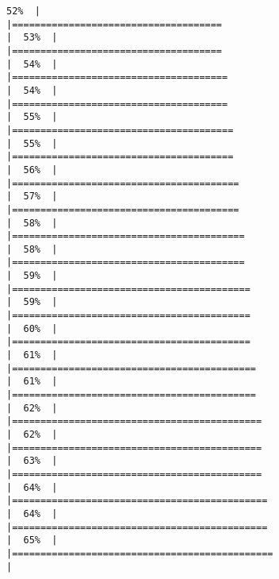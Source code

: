 \documentclass[
]{article}
\begin{document}
\begin{verbatim}
52%  |                                                                              |=====================================                                 |  53%  |                                                                              |=====================================                                 |  54%  |                                                                              |======================================                                |  54%  |                                                                              |======================================                                |  55%  |                                                                              |=======================================                               |  55%  |                                                                              |=======================================                               |  56%  |                                                                              |========================================                              |  57%  |                                                                              |========================================                              |  58%  |                                                                              |=========================================                             |  58%  |                                                                              |=========================================                             |  59%  |                                                                              |==========================================                            |  59%  |                                                                              |==========================================                            |  60%  |                                                                              |==========================================                            |  61%  |                                                                              |===========================================                           |  61%  |                                                                              |===========================================                           |  62%  |                                                                              |============================================                          |  62%  |                                                                              |============================================                          |  63%  |                                                                              |============================================                          |  64%  |                                                                              |=============================================                         |  64%  |                                                                              |=============================================                         |  65%  |                                                                              |==============================================                        |  
\end{verbatim}
\end{document}
